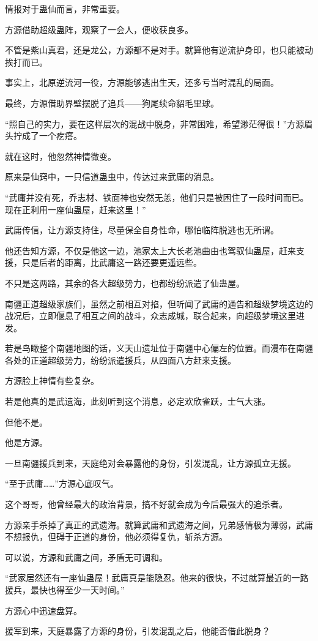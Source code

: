 \begin{this_body}
情报对于蛊仙而言，非常重要。

方源借助超级蛊阵，观察了一会人，便收获良多。

不管是紫山真君，还是龙公，方源都不是对手。就算他有逆流护身印，也只能被动挨打而已。

事实上，北原逆流河一役，方源能够逃出生天，还多亏当时混乱的局面。

最终，方源借助界壁摆脱了追兵——狗尾续命貂毛里球。

“照自己的实力，要在这样层次的混战中脱身，非常困难，希望渺茫得很！”方源眉头拧成了一个疙瘩。

就在这时，他忽然神情微变。

原来是仙窍中，一只信道蛊虫中，传达过来武庸的消息。

“武庸并没有死，乔志材、铁面神也安然无恙，他们只是被困住了一段时间而已。现在正利用一座仙蛊屋，赶来这里！”

武庸传信，让方源支持住，尽量保全自身性命，哪怕临阵脱逃也无所谓。

他还告知方源，不仅是他这一边，池家太上大长老池曲由也驾驭仙蛊屋，赶来支援，只是后者的距离，比武庸这一路还要更遥远些。

不只是这两路，其余的各大超级势力，也都纷纷派遣了仙蛊屋。

南疆正道超级家族们，虽然之前相互对掐，但听闻了武庸的通告和超级梦境这边的战况后，立即偃息了相互之间的战斗，众志成城，联合起来，向超级梦境这里进发。

若是鸟瞰整个南疆地图的话，义天山遗址位于南疆中心偏左的位置。而漫布在南疆各处的正道超级势力，纷纷派遣援兵，从四面八方赶来支援。

方源脸上神情有些复杂。

若是他真的是武遗海，此刻听到这个消息，必定欢欣雀跃，士气大涨。

但他不是。

他是方源。

一旦南疆援兵到来，天庭绝对会暴露他的身份，引发混乱，让方源孤立无援。

“至于武庸……”方源心底叹气。

这个哥哥，他曾经最大的政治背景，搞不好就会成为今后最强大的追杀者。

方源亲手杀掉了真正的武遗海。就算武庸和武遗海之间，兄弟感情极为薄弱，武庸不想报仇，但碍于正道的身份，他必须得复仇，斩杀方源。

可以说，方源和武庸之间，矛盾无可调和。

“武家居然还有一座仙蛊屋！武庸真是能隐忍。他来的很快，不过就算最近的一路援兵，最快也得至少一天时间。”

方源心中迅速盘算。

援军到来，天庭暴露了方源的身份，引发混乱之后，他能否借此脱身？

\end{this_body}

